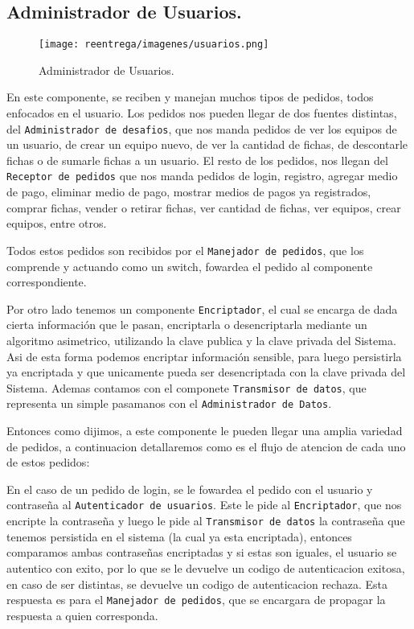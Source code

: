 \subsection{Administrador de Usuarios.}

\begin{figure}[H]
   \centering
   \texttt{[image: reentrega/imagenes/usuarios.png]}
   \caption{Administrador de Usuarios.}
\end{figure}

En este componente, se reciben y manejan muchos tipos de pedidos, todos enfocados en el usuario. Los pedidos nos pueden llegar de dos fuentes distintas, del \texttt{Administrador de desafios}, que nos manda pedidos de ver los equipos de un usuario, de crear un equipo nuevo, de ver la cantidad de fichas, de descontarle fichas o de sumarle fichas a un usuario. El resto de los pedidos, nos llegan del \texttt{Receptor de pedidos} que nos manda pedidos de login, registro, agregar medio de pago, eliminar medio de pago, mostrar medios de pagos ya registrados, comprar fichas, vender o retirar fichas, ver cantidad de fichas, ver equipos, crear equipos, entre otros.

Todos estos pedidos son recibidos por el \texttt{Manejador de pedidos}, que los comprende y actuando como un switch, fowardea el pedido al componente correspondiente.

Por otro lado tenemos un componente \texttt{Encriptador}, el cual se encarga de dada cierta información que le pasan, encriptarla o desencriptarla mediante un algoritmo asimetrico, utilizando la clave publica y la clave privada del Sistema. Asi de esta forma podemos encriptar información sensible, para luego persistirla ya encriptada y que unicamente pueda ser desencriptada con la clave privada del Sistema. Ademas contamos con el componete \texttt{Transmisor de datos}, que representa un simple pasamanos con el \texttt{Administrador de Datos}.

Entonces como dijimos, a este componente le pueden llegar una amplia variedad de pedidos, a continuacion detallaremos como es el flujo de atencion de cada uno de estos pedidos:

En el caso de un pedido de login, se le fowardea el pedido con el usuario y contraseña al \texttt{Autenticador de usuarios}. Este le pide al \texttt{Encriptador}, que nos encripte la contraseña y luego le pide al \texttt{Transmisor de datos} la contraseña que tenemos persistida en el sistema (la cual ya esta encriptada), entonces comparamos ambas contraseñas encriptadas y si estas son iguales, el usuario se autentico con exito, por lo que se le devuelve un codigo de autenticacion exitosa, en caso de ser distintas, se devuelve un codigo de autenticacion rechaza. Esta respuesta es para el \texttt{Manejador de pedidos}, que se encargara de propagar la respuesta a quien corresponda.

